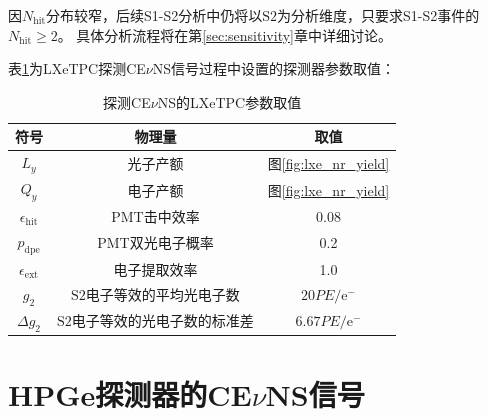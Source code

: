 因$N_\mathrm{hit}$分布较窄，后续S1-S2分析中仍将以$\mathrm{S2}$为分析维度，只要求S1-S2事件的$N_\mathrm{hit}\ge2$。
具体分析流程将在第\ref{sec:sensitivity}章中详细讨论。

表\ref{tab:lxe_tpc_parameters}为LXeTPC探测CE$\nu$NS信号过程中设置的探测器参数取值：

\begin{table}
  \centering
  \caption{探测CE$\nu$NS的LXeTPC参数取值}
  \begin{tabular}{c|c|c}
    \toprule
    符号 & 物理量 & 取值 \\
    \midrule
    $L_y$ & 光子产额 & 图\ref{fig:lxe_nr_yield} \\
    $Q_y$ & 电子产额 & 图\ref{fig:lxe_nr_yield} \\
    $\epsilon_\mathrm{hit}$ & PMT击中效率 & 0.08 \\
    $p_\mathrm{dpe}$ & PMT双光电子概率 & 0.2 \\
    $\epsilon_\mathrm{ext}$ & 电子提取效率 & 1.0 \\
    $g_2$ & $\mathrm{S2}$电子等效的平均光电子数 & $20\si{PE/\mathrm{e}^-}$ \\
    $\Delta g_2$ & $\mathrm{S2}$电子等效的光电子数的标准差 & $6.67\si{PE/\mathrm{e}^-}$ \\
    \bottomrule
  \end{tabular}
  \label{tab:lxe_tpc_parameters}
\end{table}

\section{HPGe探测器的CE$\nu$NS信号}
